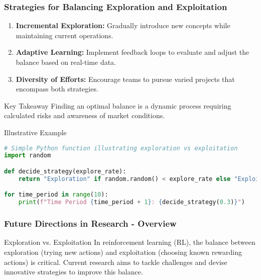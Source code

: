 \documentclass[aspectratio=169]{beamer}
\begin{document}
\begin{frame}[fragile]
    \frametitle{Strategies for Balancing Exploration and Exploitation}
    \begin{enumerate}
        \item \textbf{Incremental Exploration:} Gradually introduce new concepts while maintaining current operations.
        \item \textbf{Adaptive Learning:} Implement feedback loops to evaluate and adjust the balance based on real-time data.
        \item \textbf{Diversity of Efforts:} Encourage teams to pursue varied projects that encompass both strategies.
    \end{enumerate}

    \begin{block}{Key Takeaway}
        Finding an optimal balance is a dynamic process requiring calculated risks and awareness of market conditions.
    \end{block}

    \begin{block}{Illustrative Example}
        \begin{lstlisting}[language=Python]
# Simple Python function illustrating exploration vs exploitation
import random

def decide_strategy(explore_rate):
    return "Exploration" if random.random() < explore_rate else "Exploitation"

for time_period in range(10):
    print(f"Time Period {time_period + 1}: {decide_strategy(0.3)}")
        \end{lstlisting}
    \end{block}
\end{frame}

\begin{frame}[fragile]
    \frametitle{Future Directions in Research - Overview}
    \begin{block}{Exploration vs. Exploitation}
        In reinforcement learning (RL), the balance between exploration (trying new actions) and exploitation (choosing known rewarding actions) is critical. Current research aims to tackle challenges and devise innovative strategies to improve this balance.
    \end{block}
\end{frame}
\end{document}
